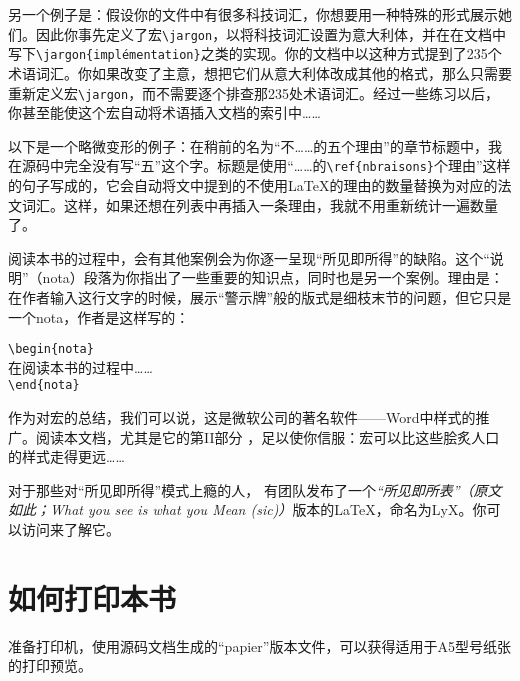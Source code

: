 另一个例子是：假设你的文件中有很多科技词汇，你想要用一种特殊的形式展示她们。因此你事先定义了宏\texttt{\backslash jargon}，以将科技词汇设置为意大利体，并在在文档中写下\texttt{\backslash jargon\{implémentation\}}之类的实现。你的文档中以这种方式提到了235个术语词汇。你如果改变了主意，想把它们从意大利体改成其他的格式，那么只需要重新定义宏\texttt{\backslash jargon}，而不需要逐个排查那235处术语词汇。经过一些练习以后，你甚至能使这个宏自动将术语插入文档的索引中……

以下是一个略微变形的例子：在稍前的名为“不……的五个理由”的章节标题中，我在源码中完全没有写“五”这个字。标题是使用“……的\texttt{\backslash ref\{nbraisons\}}个理由”这样的句子写成的，它会自动将文中提到的不使用\LaTeX 的理由的数量替换为对应的法文词汇。这样，如果还想在列表中再插入一条理由，我就不用重新统计一遍数量了。

\begin{exclamation}
    阅读本书的过程中，会有其他案例会为你逐一呈现“所见即所得”的缺陷。这个“说明”（nota）段落为你指出了一些重要的知识点，同时也是另一个案例。理由是：在作者输入这行文字的时候，展示“警示牌”般的版式是细枝末节的问题，但它只是一个nota，作者是这样写的：

    \begin{dmd}
\verb+\begin{nota}+\\
  在阅读本书的过程中……\\
\verb+\end{nota}+
    \end{dmd}
\end{exclamation}

作为对宏的总结，我们可以说，这是微软公司的著名软件——Word中样式的推广。阅读本文档，尤其是它的第II部分%
，足以使你信服：宏可以比这些脍炙人口的样式走得更远……

对于那些对“所见即所得”模式上瘾的人， 有团队发布了一个\textit{“所见即所表”（原文如此；What you see is what you Mean (sic)）}版本的\LaTeX ，命名为LyX。你可以访问来了解它。

\section*{如何打印本书}

准备打印机，使用源码文档生成的“papier”版本文件，可以获得适用于A5型号纸张的打印预览。

